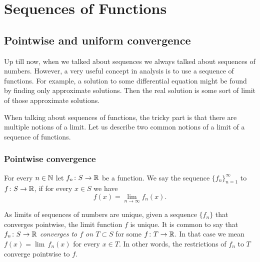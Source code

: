 \chapter{Sequences of Functions} \label{fs:chapter}


\section{Pointwise and uniform convergence}
\label{sec:puconv}


Up till now, when we talked about sequences we always talked about
sequences of numbers.  However, a very useful concept in analysis is to use a
sequence of functions.  For example, a solution to some
differential equation
might be found by finding only approximate solutions.  Then the real solution is
some sort of limit of those approximate solutions.

When talking about sequences of functions, the 
tricky part is that there are multiple notions of a limit.
Let us describe two common
notions of a limit of a sequence of functions.

\subsection{Pointwise convergence}

\begin{defn}
For every $n \in {\mathbb{N}}$
let $f_n \colon S \to {\mathbb{R}}$ be a function.  We say the sequence
$\{ f_n \}_{n=1}^\infty$
\emph{} to $f \colon S \to {\mathbb{R}}$, if for every $x
\in S$
we have
\begin{equation*}
f(x) =
\lim_{n\to\infty} f_n(x) .
\end{equation*}
\end{defn}

As limits of sequences of numbers are unique, given a sequence $\{ f_n \}$ that
converges pointwise, the limit function $f$ is unique.
It is common to say that $f_n \colon S \to {\mathbb{R}}$
\emph{converges to $f$ on $T \subset S$}
for some $f \colon T \to {\mathbb{R}}$.  In that case we mean 
$f(x) = \lim\, f_n(x)$ for every $x \in T$.  In other words, the
restrictions of $f_n$ to $T$ converge pointwise to $f$.


